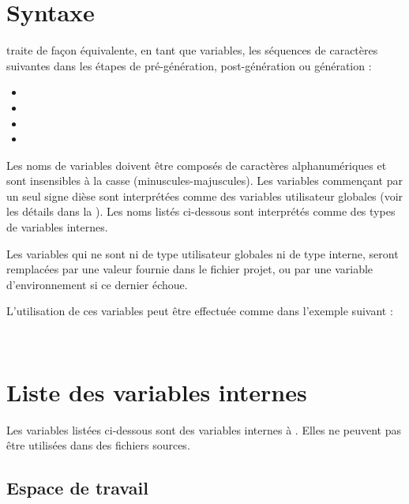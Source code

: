 \section{Syntaxe}

\codeblocks traite de façon équivalente, en tant que variables, les séquences de caractères suivantes dans les étapes de pré-génération, post-génération ou génération :

\begin{itemize}
\item {}
\item {}
\item {}
\item {}
\end{itemize}

Les noms de variables doivent être composés de caractères alphanumériques et sont insensibles à la casse (minuscules-majuscules). Les variables commençant par un seul signe dièse \codeline{(#)} sont interprétées comme des variables utilisateur globales (voir les détails dans la ). Les noms listés ci-dessous sont interprétés comme des types de variables internes.

Les variables qui ne sont ni de type utilisateur globales ni de type interne, seront remplacées par une valeur fournie dans le fichier projet, ou par une variable d'environnement si ce dernier échoue.

L'utilisation de ces variables peut être effectuée comme dans l'exemple suivant :

 \\


\section{Liste des variables internes}\label{sec:builtin_variables}

Les variables listées ci-dessous sont des variables internes à \codeblocks. Elles ne peuvent pas être utilisées dans des fichiers sources.

\subsection{Espace de travail \codeblocks}

